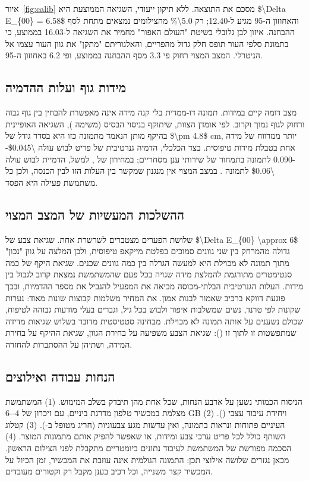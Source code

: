איור~\ref{fig:calib} מסכם את התוצאה. ללא תיקון ייעודי, השגיאה הממוצעת היא \num{$\Delta E_{00} = 6.58$} והאחוזון ה-\num{95} מגיע ל-\num{12.40}; רק \num{5.0\%} מהצילומים נמצאים מתחת לסף ההבחנה. איזון לבן גלובלי בשיטת "העולם האפור" מחמיר את השגיאה ל-\num{16.03} בממוצע, כי בתמונת סלפי העור תופס חלק גדול מהפריים, והאלגוריתם "מתקן" את גוון העור עצמו אל הניטרלי. המצב המצוי רחוק פי \num{3.3} מסף ההבחנה בממוצע, ופי \num{6.2} באחוזון ה-\num{95}.

\subsection{מידות גוף ועלות ההדמיה}
מצב דומה קיים במידות. תמונה דו-ממדית בלי קנה מידה אינה מאפשרת להבחין בין גוף גבוה ורחוק לגוף נמוך וקרוב. לפי אומדן הצוות, שיתוקף בניסוי הבסיס (משימה ), השגיאה האופיינית בהיקף מותן הנאמד מתמונה כזו היא בסדר גודל של \num{$\pm 4.8$ cm}, יותר ממרווח של מידה אחת בטבלת מידות טיפוסית. בצד הכלכלי, הדמיה גנרטיבית של פריט לבוש עולה \num{\$0.045--0.090} לתמונה בתמחור של שירותי ענן מסחריים; במחירון של , למשל, הדמיית לבוש עולה \num{\$0.06} לתמונה \cite{google2026vertex}. במצב המצוי אין מנגנון שמקשר בין העלות הזו לבין הכנסה, ולכן כל משתמשת פעילה היא הפסד.

\subsection{ההשלכות המעשיות של המצב המצוי}
שלושת הפערים מצטברים לשרשרת אחת. שגיאת צבע של \num{$\Delta E_{00} \approx 6$} גדולה מהמרחק בין שני גוונים סמוכים בפלטת מייקאפ טיפוסית, ולכן המלצה על גוון "נכון" מתוך תמונה לא מכוילת היא למעשה הגרלה בין כמה גוונים שכנים. שגיאת היקף של כמה סנטימטרים מתורגמת להמלצת מידה שגויה בכל פעם שהמשתמשת נמצאת קרוב לגבול בין מידות. העלות הגנרטיבית הבלתי-מכוסה מביאה את המפעיל להגביל את מספר ההדמיות, ובכך פוגעת דווקא ברכיב שאמור לבנות אמון. את המחיר משלמות קבוצות שונות מאוד: נערות שקונות לפי טרנד, נשים שמשלבות איפור ולבוש בכל גיל, וגברים בעלי מודעות גבוהה לטיפוח, שכולם נשענים על אותה תמונה לא מכוילת. מבחינה סטטיסטית מדובר בשלוש שגיאות מדידה שמתפשטות זו לתוך זו (): שגיאת הצבע משפיעה על בחירת הגוון, שגיאת ההיקף על בחירת המידה, ושתיהן על ההסתברות להחזרה.

\subsection{הנחות עבודה ואילוצים}
הניסוח הכמותי נשען על ארבע הנחות, שכל אחת מהן תיבדק בשלב המימוש. (\num{1}) המשתמשת מצלמת במכשיר טלפון מדרגת ביניים, עם זיכרון של \num{4--6 GB} ויחידת עיבוד עצבי (). (\num{2}) העיניים פתוחות ונראות בתמונה, ואין עדשות מגע צבעוניות (חריג מטופל ב-). (\num{3}) קטלוג השותף כולל לכל פריט ערכי צבע ומידות, או שאפשר להפיק אותם מתמונות המוצר. (\num{4}) הסכמה מפורשת של המשתמשת לעיבוד נתונים ביומטריים מתקבלת לפני הצילום הראשון. מכאן נגזרים שלושה אילוצי תכן: התמונה הגולמית אינה עוזבת את המכשיר, זמן הכיול על המכשיר קצר משנייה, וכל רכיב בענן מקבל רק וקטורים מעובדים.

